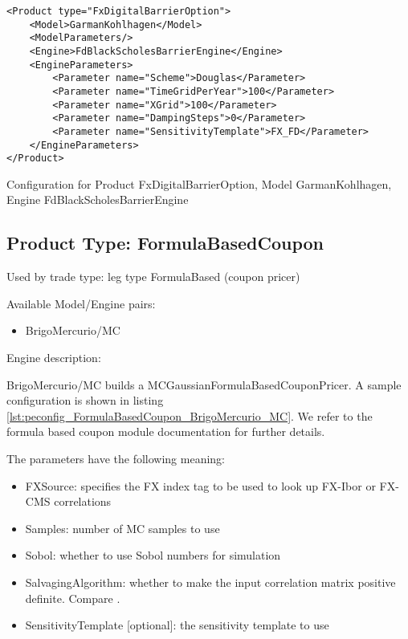 \begin{longlisting}
\begin{verbatim}
<Product type="FxDigitalBarrierOption">
    <Model>GarmanKohlhagen</Model>
    <ModelParameters/>
    <Engine>FdBlackScholesBarrierEngine</Engine>
    <EngineParameters>
        <Parameter name="Scheme">Douglas</Parameter>
        <Parameter name="TimeGridPerYear">100</Parameter>
        <Parameter name="XGrid">100</Parameter>
        <Parameter name="DampingSteps">0</Parameter>
        <Parameter name="SensitivityTemplate">FX_FD</Parameter>
    </EngineParameters>
</Product>
\end{verbatim}
\caption{Configuration for Product FxDigitalBarrierOption, Model GarmanKohlhagen, Engine FdBlackScholesBarrierEngine}
\label{lst:peconfig_FxDigitalBarrierOption_GarmanKohlhagen_FdBlackScholesBarrierEngine}
\end{longlisting}

\subsection{Product Type: FormulaBasedCoupon}

Used by trade type: leg type FormulaBased (coupon pricer)

Available Model/Engine pairs:

\begin{itemize}
\item BrigoMercurio/MC
\end{itemize}

Engine description:

BrigoMercurio/MC builds a MCGaussianFormulaBasedCouponPricer. A sample configuration is shown in listing
\ref{lst:peconfig_FormulaBasedCoupon_BrigoMercurio_MC}. We refer to the formula based coupon module documentation for
further details.

The parameters have the following meaning:

\begin{itemize}
\item FXSource: specifies the FX index tag to be used to look up FX-Ibor or FX-CMS correlations
\item Samples: number of MC samples to use
\item Sobol: whether to use Sobol numbers for simulation
\item SalvagingAlgorithm: whether to make the input correlation matrix positive definite. Compare \cite{corrSalv}.
\item SensitivityTemplate [optional]: the sensitivity template to use 
\end{itemize}

